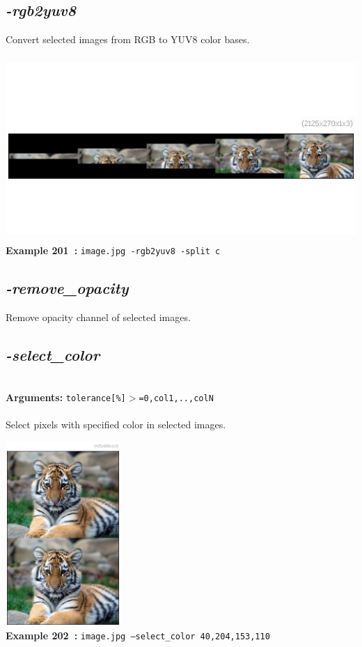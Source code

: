 \documentclass[a4paper,11pt,twoside]{book}
\begin{document}
\subsection{\emph{-rgb2yuv8} }\vspace*{-0.5em}
Convert selected images from RGB to YUV8 color bases.
\begin{center}\includegraphics[keepaspectratio=true,height=7cm,width=\textwidth]{img/gmic_def201.jpg}\\
{\footnotesize \textbf{Example 201~:} \texttt{image.jpg -rgb2yuv8 -split c}}
\end{center}

\subsection{\emph{-remove\_opacity} }\vspace*{-0.5em}
Remove opacity channel of selected images.


\subsection{\emph{-select\_color} }\vspace*{-0.5em}
~\\\textbf{Arguments: } 
{\small \texttt{tolerance[\%]$>$=0,col1,..,colN}}\\~\\
Select pixels with specified color in selected images.
\begin{center}\includegraphics[keepaspectratio=true,height=7cm,width=\textwidth]{img/gmic_def202.jpg}\\
{\footnotesize \textbf{Example 202~:} \texttt{image.jpg --select\_color 40,204,153,110}}
\end{center}
\end{document}
